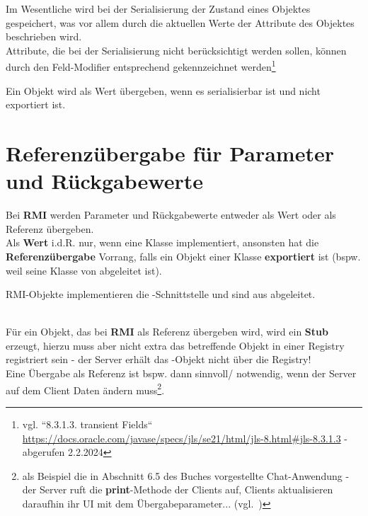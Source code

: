 \noindent
Im Wesentliche wird bei der Serialisierung der Zustand eines Objektes gespeichert, was vor allem durch die aktuellen Werte der Attribute des Objektes beschrieben wird.\\

\noindent
Attribute, die bei der Serialisierung nicht berücksichtigt werden sollen, können durch den Feld-Modifier  entsprechend gekennzeichnet werden\footnote{
vgl. ``8.3.1.3. transient Fields`` \url{https://docs.oracle.com/javase/specs/jls/se21/html/jls-8.html#jls-8.3.1.3} - abgerufen 2.2.2024
}


\begin{tcolorbox}
    Ein Objekt wird als Wert übergeben, wenn es serialisierbar ist und nicht exportiert ist.
\end{tcolorbox}


\section{Referenzübergabe für Parameter und Rückgabewerte}

Bei \textbf{RMI} werden Parameter und Rückgabewerte entweder als Wert oder als Referenz übergeben.\\

\noindent
Als \textbf{Wert} i.d.R. nur, wenn eine Klasse  implementiert, ansonsten hat die \textbf{Referenzübergabe} Vorrang, falls ein Objekt einer Klasse \textbf{exportiert} ist (bspw. weil seine Klasse von  abgeleitet ist).\\



\begin{tcolorbox}
    RMI-Objekte implementieren die -Schnittstelle und sind aus  abgeleitet.
\end{tcolorbox}\\

\noindent
Für ein Objekt, das bei \textbf{RMI} als Referenz übergeben wird, wird ein \textbf{Stub} erzeugt, hierzu muss aber nicht extra das betreffende Objekt in einer Registry registriert sein - der Server erhält das -Objekt nicht über die Registry!\\

\noindent
Eine Übergabe als Referenz ist bspw. dann sinnvoll/ notwendig, wenn der Server auf dem Client Daten ändern muss\footnote{als Beispiel die in Abschnitt 6.5 des Buches vorgestellte Chat-Anwendung - der Server ruft die \textbf{print}-Methode der Clients auf, Clients aktualisieren daraufhin ihr UI mit dem Übergabeparameter... (vgl.~\cite[Listing 6.22, Listing 6.24]{Oec22})}.\\

